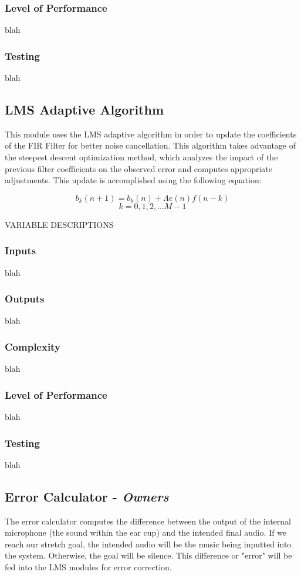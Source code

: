 \documentclass[12pt]{article}
\begin{document}
\begin{multicols}{2}
\subsubsection{Level of Performance}
blah
\subsubsection{Testing}
blah

\subsection{LMS Adaptive Algorithm}
This module uses the LMS adaptive algorithm in order to update the coefficients of the FIR Filter for better noise cancellation. This algorithm takes advantage of the steepest descent optimization method, which analyzes the impact of the previous filter coefficients on the observed error and computes appropriate adjustments. This update is accomplished using the following equation:

$$b_k(n + 1) = b_k(n) + \Lambda e(n)f(n-k)$$
$$k = 0, 1, 2,... M-1$$

VARIABLE DESCRIPTIONS
\subsubsection{Inputs}
blah
\subsubsection{Outputs}
blah
\subsubsection{Complexity}
blah
\subsubsection{Level of Performance}
blah
\subsubsection{Testing}
blah

\subsection{Error Calculator - \textit{Owners}}
The error calculator computes the difference between the output of the internal microphone (the sound within the ear cup) and the intended final audio. If we reach our stretch goal, the intended audio will be the music being inputted into the system. Otherwise, the goal will be silence. This difference or "error" will be fed into the LMS modules for error correction.

\end{multicols}
\end{document}
